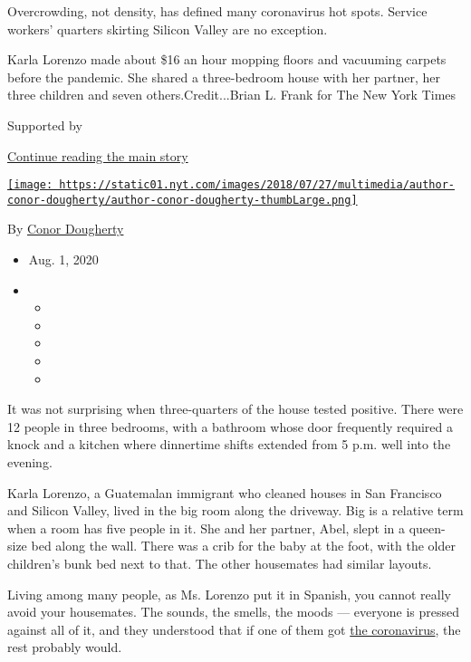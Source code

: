 Overcrowding, not density, has defined many coronavirus hot spots.
Service workers' quarters skirting Silicon Valley are no exception.

Karla Lorenzo made about \$16 an hour mopping floors and vacuuming
carpets before the pandemic. She shared a three-bedroom house with her
partner, her three children and seven others.Credit...Brian L. Frank for
The New York Times

Supported by

\protect\hyperlink{after-sponsor}{Continue reading the main story}

\href{https://www.nytimes.com/by/conor-dougherty}{\texttt{[image: https://static01.nyt.com/images/2018/07/27/multimedia/author-conor-dougherty/author-conor-dougherty-thumbLarge.png]}}

By \href{https://www.nytimes.com/by/conor-dougherty}{Conor Dougherty}

\begin{itemize}
\item
  Aug. 1, 2020
\item
  \begin{itemize}
  \item
  \item
  \item
  \item
  \item
  \end{itemize}
\end{itemize}

It was not surprising when three-quarters of the house tested positive.
There were 12 people in three bedrooms, with a bathroom whose door
frequently required a knock and a kitchen where dinnertime shifts
extended from 5 p.m. well into the evening.

Karla Lorenzo, a Guatemalan immigrant who cleaned houses in San
Francisco and Silicon Valley, lived in the big room along the driveway.
Big is a relative term when a room has five people in it. She and her
partner, Abel, slept in a queen-size bed along the wall. There was a
crib for the baby at the foot, with the older children's bunk bed next
to that. The other housemates had similar layouts.

Living among many people, as Ms. Lorenzo put it in Spanish, you cannot
really avoid your housemates. The sounds, the smells, the moods ---
everyone is pressed against all of it, and they understood that if one
of them got \href{https://www.nytimes.com/news-event/coronavirus}{the
coronavirus}, the rest probably would.

